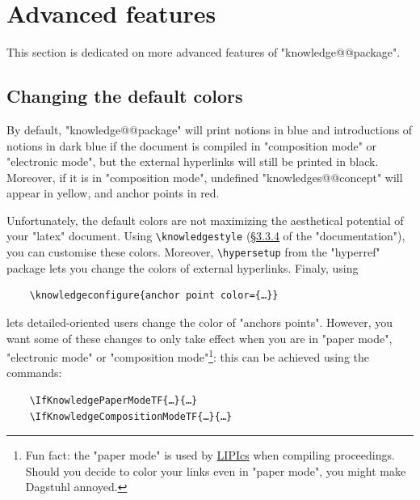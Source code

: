 \documentclass{article}
\begin{document}
\section{Advanced features}
\label{sec:advanced-features}

This section is dedicated on more advanced features of "knowledge@@package".

\subsection{Changing the default colors}

By default, "knowledge@@package" will print notions in blue and
introductions of notions in dark blue if the document is compiled
in "composition mode" or "electronic mode", but the external hyperlinks
will still be printed in black. Moreover, if it is in
"composition mode", undefined "knowledges@@concept" will appear in yellow,
and anchor points in red.

Unfortunately, the default colors are not maximizing the aesthetical
potential of your "latex" document.
Using \verb|\knowledgestyle| (\href{https://distrib-coffee.ipsl.jussieu.fr/pub/mirrors/ctan/macros/latex/contrib/knowledge/knowledge.pdf#subsubsection.3.3.4}{§3.3.4} of the "documentation"), you can customise these colors. Moreover,
\verb|\hypersetup| from the "hyperref" package lets you change the colors of
external hyperlinks. Finaly, using
\begin{verbatim}
    \knowledgeconfigure{anchor point color={…}}
\end{verbatim}
lets detailed-oriented users change the color of "anchors points".
However, you want some of these changes to only take effect when you are in
"paper mode", "electronic mode" or "composition mode"\footnote{Fun fact:
the "paper mode" is used by \href{https://www.dagstuhl.de/en/publications/lipics}{LIPIcs} when compiling proceedings. Should you decide
to color your links even in "paper mode", you might make Dagstuhl annoyed.}:
this can be achieved using the commands:
\begin{verbatim}
    \IfKnowledgePaperModeTF{…}{…}
    \IfKnowledgeCompositionModeTF{…}{…}
\end{verbatim}
\end{document}
